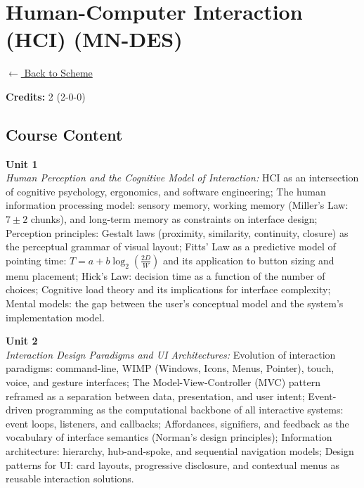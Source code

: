 \section*{Human-Computer Interaction (HCI) (MN-DES)}
\label{minor:DES_L1}

\noindent \small{\hyperref[main:scheme]{$\leftarrow$ Back to Scheme}} \vspace{0.5cm}

\noindent \textbf{Credits:} 2 (2-0-0)

\subsection*{Course Content}
\noindent\textbf{Unit 1} \\
\textit{Human Perception and the Cognitive Model of Interaction:} HCI as an intersection of cognitive psychology, ergonomics, and software engineering; The human information processing model: sensory memory, working memory (Miller's Law: $7 \pm 2$ chunks), and long-term memory as constraints on interface design; Perception principles: Gestalt laws (proximity, similarity, continuity, closure) as the perceptual grammar of visual layout; Fitts' Law as a predictive model of pointing time: $T = a + b \log_2\!\left(\frac{2D}{W}\right)$ and its application to button sizing and menu placement; Hick's Law: decision time as a function of the number of choices; Cognitive load theory and its implications for interface complexity; Mental models: the gap between the user's conceptual model and the system's implementation model.

\vspace{0.3cm}

\noindent\textbf{Unit 2} \\
\textit{Interaction Design Paradigms and UI Architectures:} Evolution of interaction paradigms: command-line, WIMP (Windows, Icons, Menus, Pointer), touch, voice, and gesture interfaces; The Model-View-Controller (MVC) pattern reframed as a separation between data, presentation, and user intent; Event-driven programming as the computational backbone of all interactive systems: event loops, listeners, and callbacks; Affordances, signifiers, and feedback as the vocabulary of interface semantics (Norman's design principles); Information architecture: hierarchy, hub-and-spoke, and sequential navigation models; Design patterns for UI: card layouts, progressive disclosure, and contextual menus as reusable interaction solutions.

